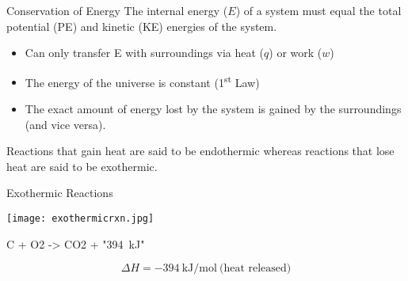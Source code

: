 \documentclass[notes=only]{beamer}
\begin{document}

\begin{frame}{Conservation of Energy}
	The \alert{internal energy} ($E$) of a system must equal the total
	potential (PE) and kinetic (KE) energies of the system.
	\begin{itemize}[<+->]
		\item Can only transfer E with surroundings via
			heat ($q$) or work ($w$)
		\item The energy of the universe is constant
				(1\textsuperscript{st} Law)
		\item The exact amount of energy lost by the
			system is gained by the surroundings
			(and vice versa).
	\end{itemize}
	Reactions that \alert{gain} heat are said to be \alert{endothermic}
	whereas reactions that \alert{lose} heat are said to be
	\alert{exothermic}.
\end{frame}

\begin{frame}{Exothermic Reactions}
		\begin{center}
			\texttt{[image: exothermicrxn.jpg]}
		\end{center}
	\begin{reaction*}
		C\sld[graphite]{} + O2\gas{} -> CO2\gas{} +
		"\SI{394}{\kilo\joule}"
	\end{reaction*}
	\begin{equation*}
		\Delta H = \SI{-394}{\kilo\joule\per\mole}~\text{(heat
		released)}
	\end{equation*}
\end{frame}
\end{document}
